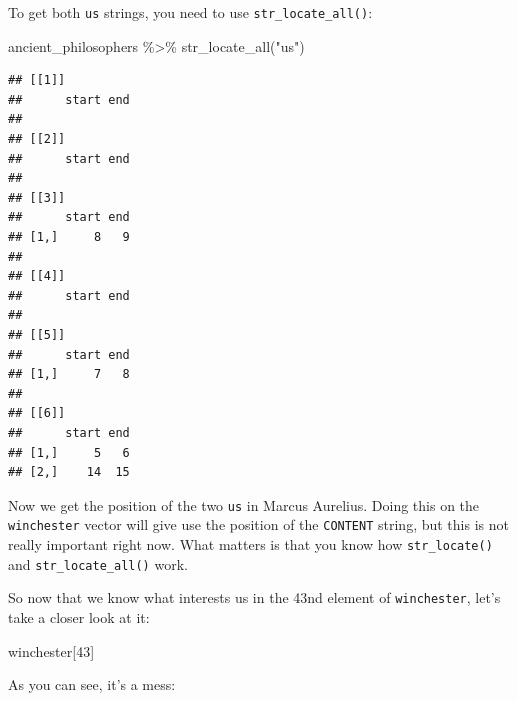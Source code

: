 \documentclass[
]{article}
\newenvironment{Shaded}{\begin{snugshade}}{\end{snugshade}}
\newcommand{\DecValTok}[1]{\textcolor[rgb]{0.00,0.00,0.81}{#1}}
\newcommand{\FunctionTok}[1]{\textcolor[rgb]{0.00,0.00,0.00}{#1}}
\newcommand{\NormalTok}[1]{#1}
\newcommand{\SpecialCharTok}[1]{\textcolor[rgb]{0.00,0.00,0.00}{#1}}
\newcommand{\StringTok}[1]{\textcolor[rgb]{0.31,0.60,0.02}{#1}}
\begin{document}
To get both \texttt{us} strings, you need to use \texttt{str\_locate\_all()}:

\begin{Shaded}
\begin{Highlighting}[]
\NormalTok{ancient\_philosophers }\SpecialCharTok{\%\textgreater{}\%}
  \FunctionTok{str\_locate\_all}\NormalTok{(}\StringTok{"us"}\NormalTok{)}
\end{Highlighting}
\end{Shaded}

\begin{verbatim}
## [[1]]
##      start end
## 
## [[2]]
##      start end
## 
## [[3]]
##      start end
## [1,]     8   9
## 
## [[4]]
##      start end
## 
## [[5]]
##      start end
## [1,]     7   8
## 
## [[6]]
##      start end
## [1,]     5   6
## [2,]    14  15
\end{verbatim}

Now we get the position of the two \texttt{us} in Marcus Aurelius. Doing this on the \texttt{winchester} vector
will give use the position of the \texttt{CONTENT} string, but this is not really important right now. What
matters is that you know how \texttt{str\_locate()} and \texttt{str\_locate\_all()} work.

So now that we know what interests us in the 43nd element of \texttt{winchester}, let's take a closer
look at it:

\begin{Shaded}
\begin{Highlighting}[]
\NormalTok{winchester[}\DecValTok{43}\NormalTok{]}
\end{Highlighting}
\end{Shaded}

As you can see, it's a mess:
\end{document}
